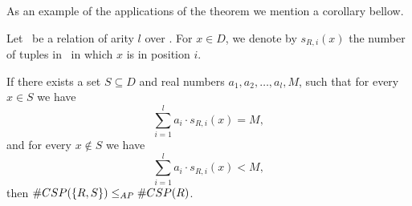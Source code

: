 \begin{comment}
We want to choose \mm\ large enough such that the following holds.
\begin{eqnarray*}
|V|^{|D|} \cdot \left(\frac{M-1}{M}\right)^{m} & \le & 1 \\
\log (|V|^{|D|}) + \log\left( \left(1-\frac{1}{M}\right)^{m} \right) & \le &  0 \\
|D| \cdot \log |V| + m \cdot \log \left(1-\frac{1}{M}\right) & \le & 0 \\ 
|D| \cdot \log |V| & \le & m \cdot -\log \left(1-\frac{1}{M}\right) \\ 
\frac{|D| \cdot \log |V|}{-\log \left(1-\frac{1}{M}\right)} & \le & m.
\end{eqnarray*}
For any \(0<x<1\) we have \(\-log (1-x) > x \); hence, 
\[
\frac{|D| \cdot \log |V|}{-\log \left(1-\frac{1}{M}\right)} \le 
M \cdot |D| \cdot \log |V|
\]
This implies for \(m \ge M \cdot |D| \cdot \log |V|\), we have 
\(\#P=\lfloor N \rfloor\)
\end{itemize}
\end{proof}
\end{comment}

As an example of the applications of the theorem we mention a corollary bellow.

Let \mR\ be a relation of arity \(l\) over \mD\@.
For \(x\in D\), we denote by \(s_{R,i}(x)\) the number of tuples in \mR\ in which \(x\) is in position \(i\)\@.

\begin{cor}  \label{cor:degree}
If there exists a set \(S\subseteq D\) and real numbers \(a_1,a_2,\dotsc,a_l, M\), such that 
for every \(x\in S\) we have
\[\sum_{i=1}^l a_i\cdot s_{R,i}(x) = M,\]
and for every \(x\not\in S\) we have
\[\sum_{i=1}^l a_i\cdot s_{R,i}(x) < M,\]
then \(\#CSP(\{R, S\}) \le_{AP} \#CSP(R)\)\@.
\end{cor}


